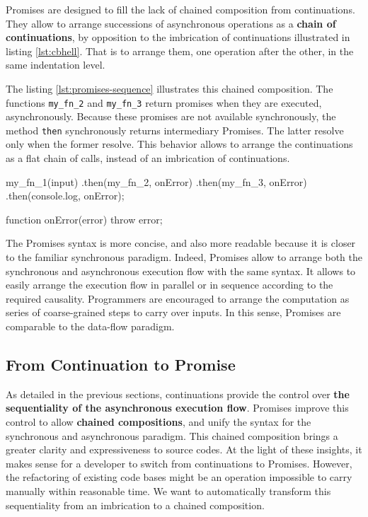 Promises are designed to fill the lack of chained composition from continuations.
They allow to arrange successions of asynchronous operations as a \textbf{chain of continuations}, by opposition to the imbrication of continuations illustrated in listing \ref{lst:cbhell}.
That is to arrange them, one operation after the other, in the same indentation level.

The listing \ref{lst:promises-sequence} illustrates this chained composition.
The functions \texttt{my_fn_2} and \texttt{my_fn_3} return promises when they are executed, asynchronously.
Because these promises are not available synchronously, the method \texttt{then} synchronously returns intermediary Promises.
The latter resolve only when the former resolve.
This behavior allows to arrange the continuations as a flat chain of calls, instead of an imbrication of continuations.

\begin{code}[js, %
             caption={A chain of Promises is more concise than an imbrication of continuations}, %
             label={lst:promises-sequence}] %
my_fn_1(input)
.then(my_fn_2, onError)
.then(my_fn_3, onError)
.then(console.log, onError);

function onError(error) {
  throw error;
}
\end{code}

The Promises syntax is more concise, and also more readable because it is closer to the familiar synchronous paradigm.
Indeed, Promises allow to arrange both the synchronous and asynchronous execution flow with the same syntax.
It allows to easily arrange the execution flow in parallel or in sequence according to the required causality.
Programmers are encouraged to arrange the computation as series of coarse-grained steps to carry over inputs.
In this sense, Promises are comparable to the data-flow paradigm.

\subsection{From Continuation to Promise} \label{seciton:definitions:analysis}

As detailed in the previous sections, continuations provide the control over \textbf{the sequentiality of the asynchronous execution flow}.
Promises improve this control to allow \textbf{chained compositions}, and unify the syntax for the synchronous and asynchronous paradigm.
This chained composition brings a greater clarity and expressiveness to source codes.
At the light of these insights, it makes sense for a developer to switch from continuations to Promises.
However, the refactoring of existing code bases might be an operation impossible to carry manually within reasonable time.
We want to automatically transform this sequentiality from an imbrication to a chained composition.

